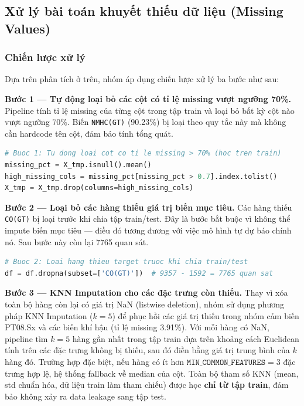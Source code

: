 \documentclass[12pt,a4paper]{report}
\begin{document}
\subsection{Xử lý bài toán khuyết thiếu dữ liệu (Missing Values)}
\subsubsection{Chiến lược xử lý}
 
Dựa trên phân tích ở trên, nhóm áp dụng chiến lược xử lý ba bước như sau:

\textbf{Bước 1 --- Tự động loại bỏ các cột có tỉ lệ missing vượt ngưỡng 70\%.}
Pipeline tính tỉ lệ missing của từng cột trong tập train và loại bỏ bất kỳ cột nào vượt ngưỡng 70\%. Biến \texttt{NMHC(GT)} (90.23\%) bị loại theo quy tắc này mà không cần hardcode tên cột, đảm bảo tính tổng quát.

\begin{lstlisting}[language=Python]
# Buoc 1: Tu dong loai cot co ti le missing > 70% (hoc tren train)
missing_pct = X_tmp.isnull().mean()
high_missing_cols = missing_pct[missing_pct > 0.7].index.tolist()
X_tmp = X_tmp.drop(columns=high_missing_cols)
\end{lstlisting}

\textbf{Bước 2 --- Loại bỏ các hàng thiếu giá trị biến mục tiêu.}
Các hàng thiếu \texttt{CO(GT)} bị loại trước khi chia tập train/test. Đây là bước bắt buộc vì không thể impute biến mục tiêu --- điều đó tương đương với việc mô hình tự dự báo chính nó. Sau bước này còn lại 7765 quan sát.

\begin{lstlisting}[language=Python]
# Buoc 2: Loai hang thieu target truoc khi chia train/test
df = df.dropna(subset=['CO(GT)'])  # 9357 - 1592 = 7765 quan sat
\end{lstlisting}

\textbf{Bước 3 --- KNN Imputation cho các đặc trưng còn thiếu.}
Thay vì xóa toàn bộ hàng còn lại có giá trị NaN (listwise deletion), nhóm sử dụng phương pháp KNN Imputation ($k=5$) để phục hồi các giá trị thiếu trong nhóm cảm biến PT08.Sx và các biến khí hậu (tỉ lệ missing 3.91\%). Với mỗi hàng có NaN, pipeline tìm $k=5$ hàng gần nhất trong tập train dựa trên khoảng cách Euclidean tính trên các đặc trưng không bị thiếu, sau đó điền bằng giá trị trung bình của $k$ hàng đó. Trường hợp đặc biệt, nếu hàng có ít hơn $\texttt{MIN\_COMMON\_FEATURES} = 3$ đặc trưng hợp lệ, hệ thống fallback về median của cột. Toàn bộ tham số KNN (mean, std chuẩn hóa, dữ liệu train làm tham chiếu) được học \textbf{chỉ từ tập train}, đảm bảo không xảy ra data leakage sang tập test.
\end{document}

